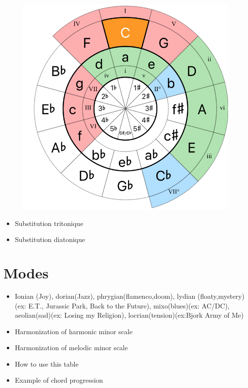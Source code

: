 \documentclass{article}
\begin{document}
\begin{figure}[h!]
	\centering
	\hspace*{-1cm}
	\includegraphics[scale=0.3, trim= {0cm 0cm 0cm 0cm}, clip]{Circle_5th.png}
	\caption{ }
	\label{fig}
\end{figure}

\begin{itemize}
	\item Substitution tritonique
	\item Substitution diatonique
\end{itemize}

\newpage
\section{Modes}






\begin{itemize}
	\item Ionian (Joy), dorian(Jazz), phrygian(flamenco,doom), lydian (floaty,mystery) (ex: E.T., Jurassic Park, Back to the Future), mixo(blues)(ex: AC/DC), aeolian(sad)(ex: Losing my Religion), locrian(tension)(ex:Bjork Army of Me) 
	\item Harmonization of harmonic minor scale
	\item Harmonization of melodic minor scale
	\item How to use this table
	\item Example of chord progression
\end{itemize}
\end{document}
